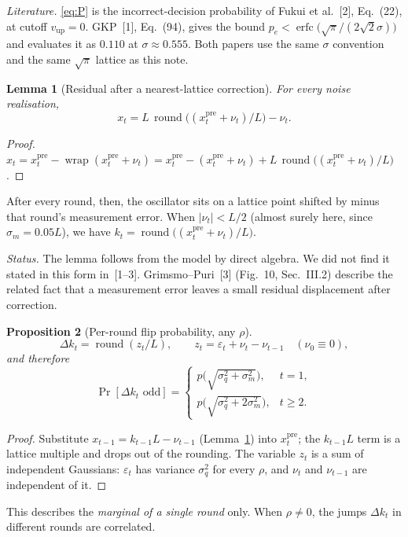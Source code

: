 \documentclass[11pt,letterpaper]{article}
\newtheorem{proposition}{Proposition}
\newtheorem{lemma}[proposition]{Lemma}
\DeclareMathOperator{\wrap}{wrap}
\DeclareMathOperator{\rnd}{round}
\DeclareMathOperator{\erfc}{erfc}
\newcommand{\xpre}{x^{\mathrm{pre}}}
\begin{document}
\noindent\emph{Literature.} \eqref{eq:P} is the incorrect-decision
probability of Fukui et al.~[2], Eq.~(22), at cutoff $v_{\mathrm{up}}=0$.
GKP~[1], Eq.~(94), gives the bound
$p_e<\erfc\bigl(\sqrt\pi/(2\sqrt2\sigma)\bigr)$ and evaluates it as $0.110$ at
$\sigma\approx0.555$. Both papers use the same $\sigma$ convention and the
same $\sqrt\pi$ lattice as this note.

\begin{lemma}[Residual after a nearest-lattice correction]\label{lem:residual}
For every noise realisation,
\[
  x_t = L\,\rnd\!\bigl((\xpre_t+\nu_t)/L\bigr)-\nu_t .
\]
\end{lemma}
\begin{proof}
$x_t=\xpre_t-\wrap(\xpre_t+\nu_t)
=\xpre_t-(\xpre_t+\nu_t)+L\,\rnd\bigl((\xpre_t+\nu_t)/L\bigr)$.
\end{proof}

After every round, then, the oscillator sits on a lattice point shifted by
minus that round's measurement error. When $|\nu_t|<L/2$ (almost surely
here, since $\sigma_m=0.05L$), we have $k_t=\rnd\bigl((\xpre_t+\nu_t)/L\bigr)$.

\noindent\emph{Status.} The lemma follows from the model by direct algebra. We
did not find it stated in this form in~[1--3]. Grimsmo--Puri~[3] (Fig.~10,
Sec.~III.2) describe the related fact that a measurement error leaves a small
residual displacement after correction.

\begin{proposition}[Per-round flip probability, any $\rho$]\label{prop:perround}
\[
  \Delta k_t=\rnd(z_t/L),\qquad
  z_t=\varepsilon_t+\nu_t-\nu_{t-1}\quad(\nu_0\equiv0),
\]
and therefore
\[
  \Pr[\Delta k_t\text{ odd}]=
  \begin{cases}
    p\bigl(\sqrt{\sigma_q^2+\sigma_m^2}\bigr), & t=1,\\[3pt]
    p\bigl(\sqrt{\sigma_q^2+2\sigma_m^2}\bigr), & t\ge2.
  \end{cases}
\]
\end{proposition}
\begin{proof}
Substitute $x_{t-1}=k_{t-1}L-\nu_{t-1}$ (Lemma~\ref{lem:residual}) into
$\xpre_t$; the $k_{t-1}L$ term is a lattice multiple and drops out of the
rounding. The variable $z_t$ is a sum of independent Gaussians:
$\varepsilon_t$ has variance $\sigma_q^2$ for every $\rho$, and $\nu_t$ and
$\nu_{t-1}$ are independent of it.
\end{proof}

This describes the \emph{marginal of a single round} only. When $\rho\ne0$,
the jumps $\Delta k_t$ in different rounds are correlated.
\end{document}
